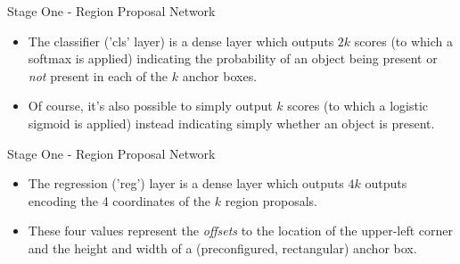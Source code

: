 \begin{frame} {Stage One - Region Proposal Network}
  \begin{figure}
    \centering
  \end{figure}
  \begin{itemize}
    \item The classifier ('cls' layer) is a dense layer which outputs $2k$ scores (to which a softmax is applied) indicating the probability of an object being present or \textit{not} present in each of the $k$ anchor boxes. 
    \item Of course, it's also possible to simply output $k$ scores (to which a logistic sigmoid is applied) instead indicating simply whether an object is present.
  \end{itemize}
\end{frame}

\begin{frame} {Stage One - Region Proposal Network}
  \begin{figure}
    \centering
  \end{figure}
  \begin{itemize}
    \item The regression ('reg') layer is a dense layer which outputs $4k$ outputs encoding the 4 coordinates of the $k$ region proposals.
    \item These four values represent the \textit{offsets} to the location of the upper-left corner and the height and width of a (preconfigured, rectangular) anchor box.
  \end{itemize}
\end{frame}



